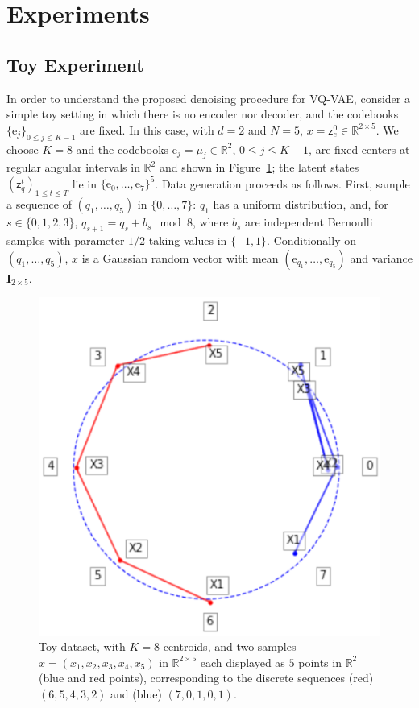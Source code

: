 \documentclass{article}
\theoremstyle{plain}
\theoremstyle{definition}
\theoremstyle{remark}
\newcommand{\rset}{\mathbb{R}}
\newcommand{\latentcont}{\mathsf{z}_e}
\newcommand{\latentdis}{\mathsf{z}_q}
\newcommand{\rme}{\mathrm{e}}
\newcommand{\embed}{\rme}
\begin{document}
\section{Experiments}

\subsection{Toy Experiment}
In order to understand the proposed denoising procedure for VQ-VAE, consider a simple toy setting in which there is no encoder nor decoder, and the codebooks $\{\embed_j\}_{0\leqslant j \leqslant K-1}$ are fixed. In this case, with $d=2$ and $N=5$, $x = \latentcont^0 \in \rset^{2\times 5}$. We choose $K=8$ and the codebooks $\embed_j = \mu_j \in \rset^2$, $0\leqslant j \leqslant K-1$, are fixed centers at regular angular intervals in $\rset^2$ and shown in Figure~\ref{fig:toydata}; the latent states $(\latentdis^t)_{1\leq t\leq T}$ lie in $\{\embed_0,\ldots,\embed_7\}^5$. Data generation proceeds as follows. First, sample a sequence of $(q_1,\ldots,q_5)$ in $\{0,\dots,7\}$: $q_1$ has a uniform distribution, and, for $s\in\{0,1,2,3\}$, $q_{s+1} = q_s + b_s \mod 8$, where $b_s$ are independent Bernoulli samples with parameter $1/2$ taking values in $\{-1, 1\}$. Conditionally on $(q_1,\ldots,q_5)$, $x$ is a Gaussian random vector with mean $(\embed_{q_1},\ldots,\embed_{q_5})$ and variance $\mathbf{I}_{2\times 5}$. 


\begin{figure}[h!]
    \centering
    \includegraphics[scale=0.55]{./centroids2.pdf}
    \caption{Toy dataset, with $K=8$ centroids, and two samples $x = (x_1,x_2,x_3,x_4,x_5)$ in $\rset^{2 \times 5}$ each displayed as $5$ points in $\rset^{2}$ (blue and red points), corresponding to the discrete sequences (red) $(6,5,4,3,2)$ and (blue) $(7,0,1,0,1)$.}
    \label{fig:toydata}
\end{figure}
\end{document}
